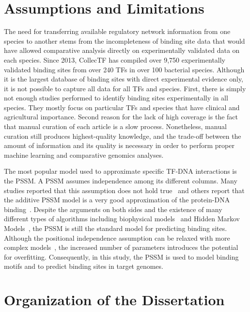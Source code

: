 \section{Assumptions and Limitations}

The need for transferring available regulatory network information from one
species to another stems from the incompleteness of binding site data that
would have allowed comparative analysis directly on experimentally validated
data on each species. Since 2013, CollecTF has compiled over 9,750
experimentally validated binding sites from over 240 TFs in over 100 bacterial
species. Although it is the largest database of binding sites with direct
experimental evidence only, it is not possible to capture all data for all TFs
and species. First, there is simply not enough studies performed to identify
binding sites experimentally in all species. They mostly focus on particular
TFs and species that have clinical and agricultural importance. Second reason
for the lack of high coverage is the fact that manual curation of each article
is a slow process. Nonetheless, manual curation still produces highest-quality
knowledge, and the trade-off between the amount of information and its quality
is necessary in order to perform proper machine learning and comparative
genomics analyses.

The most popular model used to approximate specific TF-DNA interactions is the
PSSM\@. A PSSM assumes independence among its different columns. Many studies
reported that this assumption does not hold true~\cite{man2001non,
  bulyk2002nucleotides, tomovic2007position, osada2004comparative} and others
report that the additive PSSM model is a very good approximation of the
protein-DNA binding~\cite{benos2002additivity}. Despite the arguments on both
sides and the existence of many different types of algorithms including
biophysical models~\cite{stormo1998specificity, djordjevic2003biophysical} and
Hidden Markov Models~\cite{sinha2003probabilistic, drawid2009ohmm,
  salzberg1998microbial}, the PSSM is still the standard model for predicting
binding sites. Although the positional independence assumption can be relaxed
with more complex models~\cite{ben2005identification, zhao2012improved,
  siddharthan2010dinucleotide, barash2003modeling}, the increased number of
parameters introduces the potential for overfitting. Consequently, in this
study, the PSSM is used to model binding motifs and to predict binding sites in
target genomes.

\section{Organization of the Dissertation}

